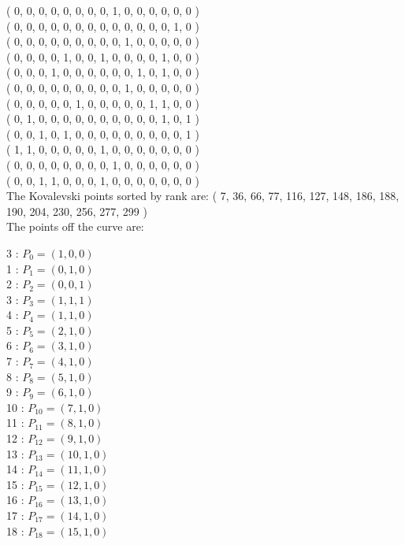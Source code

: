 \documentclass{article}
\begin{document}
{( 0, 0, 0, 0, 0, 0, 0, 0, 1, 0, 0, 0, 0, 0, 0 )\\
( 0, 0, 0, 0, 0, 0, 0, 0, 0, 0, 0, 0, 0, 1, 0 )\\
( 0, 0, 0, 0, 0, 0, 0, 0, 0, 1, 0, 0, 0, 0, 0 )\\
( 0, 0, 0, 0, 1, 0, 0, 1, 0, 0, 0, 0, 1, 0, 0 )\\
( 0, 0, 0, 1, 0, 0, 0, 0, 0, 0, 1, 0, 1, 0, 0 )\\
( 0, 0, 0, 0, 0, 0, 0, 0, 0, 1, 0, 0, 0, 0, 0 )\\
( 0, 0, 0, 0, 0, 1, 0, 0, 0, 0, 0, 1, 1, 0, 0 )\\
( 0, 1, 0, 0, 0, 0, 0, 0, 0, 0, 0, 0, 1, 0, 1 )\\
( 0, 0, 1, 0, 1, 0, 0, 0, 0, 0, 0, 0, 0, 0, 1 )\\
( 1, 1, 0, 0, 0, 0, 0, 1, 0, 0, 0, 0, 0, 0, 0 )\\
( 0, 0, 0, 0, 0, 0, 0, 0, 1, 0, 0, 0, 0, 0, 0 )\\
( 0, 0, 1, 1, 0, 0, 0, 1, 0, 0, 0, 0, 0, 0, 0 )\\
The Kovalevski points sorted by rank are: 
( 7, 36, 66, 77, 116, 127, 148, 186, 188, 190, 204, 230, 256, 277, 299 )\\
The points off the curve are: \\
\begin{multicols}{3}
 : $P_{0}=( 1, 0, 0 )$\\
1 : $P_{1}=( 0, 1, 0 )$\\
2 : $P_{2}=( 0, 0, 1 )$\\
3 : $P_{3}=( 1, 1, 1 )$\\
4 : $P_{4}=( 1, 1, 0 )$\\
5 : $P_{5}=( 2, 1, 0 )$\\
6 : $P_{6}=( 3, 1, 0 )$\\
7 : $P_{7}=( 4, 1, 0 )$\\
8 : $P_{8}=( 5, 1, 0 )$\\
9 : $P_{9}=( 6, 1, 0 )$\\
10 : $P_{10}=( 7, 1, 0 )$\\
11 : $P_{11}=( 8, 1, 0 )$\\
12 : $P_{12}=( 9, 1, 0 )$\\
13 : $P_{13}=( 10, 1, 0 )$\\
14 : $P_{14}=( 11, 1, 0 )$\\
15 : $P_{15}=( 12, 1, 0 )$\\
16 : $P_{16}=( 13, 1, 0 )$\\
17 : $P_{17}=( 14, 1, 0 )$\\
18 : $P_{18}=( 15, 1, 0 )$\\

\end{multicols}}
\end{document}
